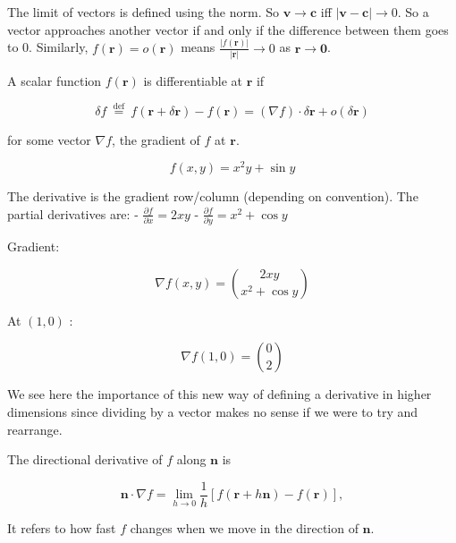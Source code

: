 \begin{ndefi}
	The limit of vectors is defined using the norm. So $\mathbf{v} \rightarrow \mathbf{c}$ iff $|\mathbf{v}-\mathbf{c}| \rightarrow 0$. So a vector approaches another vector if and only if the difference between them goes to 0. Similarly, $f(\mathbf{r})=o(\mathbf{r})$ means $\frac{|f(\mathbf{r})|}{|\mathbf{r}|} \rightarrow 0$ as $\mathbf{r} \rightarrow \mathbf{0}$. 
\end{ndefi}

\begin{ndefi}
	A scalar function $f(\mathbf{r})$ is differentiable at $\mathbf{r}$ if
	
	$$
	\delta f \stackrel{\text { def }}{=} f(\mathbf{r}+\delta \mathbf{r})-f(\mathbf{r})=(\nabla f) \cdot \delta \mathbf{r}+o(\delta \mathbf{r})
	$$
	
	for some vector $\nabla f$, the gradient of $f$ at $\mathbf{r}$.
\end{ndefi}

\begin{nex}
	$$
	f(x, y)=x^2 y+\sin y
	$$
	
	
	The derivative is the gradient row/column (depending on convention).
	The partial derivatives are:
	- $\frac{\partial f}{\partial x}=2 x y$
	- $\frac{\partial f}{\partial y}=x^2+\cos y$
	
	Gradient:
	
	$$
	\nabla f(x, y)=\binom{2 x y}{x^2+\cos y}
	$$
	
	
	At $(1,0)$ :
	
	$$
	\nabla f(1,0)=\binom{0}{2}
	$$
\end{nex}

\begin{nrem}
	We see here the importance of this new way of defining a derivative in higher dimensions since dividing by a vector makes no sense if we were to try and rearrange.
\end{nrem}

\begin{ndefi}
	The directional derivative of $f$ along $\mathbf{n}$ is
	
	$$
	\mathbf{n} \cdot \nabla f=\lim _{h \rightarrow 0} \frac{1}{h}[f(\mathbf{r}+h \mathbf{n})-f(\mathbf{r})],
	$$
	
	
	It refers to how fast $f$ changes when we move in the direction of $\mathbf{n}$.
\end{ndefi}

